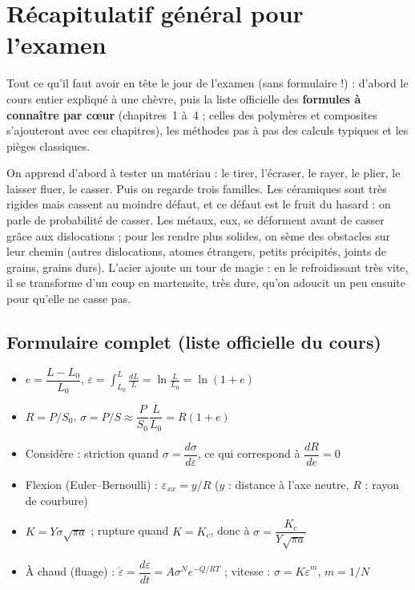 \chapter{Récapitulatif général pour l'examen}

\begin{rembox}[title=Ce chapitre]
Tout ce qu'il faut avoir en tête le jour de l'examen (sans formulaire !) : d'abord le cours
entier expliqué à une chèvre, puis la liste officielle des \textbf{formules à connaître par
c\oe ur} (chapitres~1 à~4 ; celles des polymères et composites s'ajouteront avec ces
chapitres), les méthodes pas à pas des calculs typiques et les pièges classiques.
\end{rembox}

\begin{goatbox}[title={Tout le cours à une chèvre}]
On apprend d'abord à \og tester\fg{} un matériau : le tirer, l'écraser, le rayer, le plier, le
laisser fluer, le casser. Puis on regarde trois familles. Les céramiques sont très rigides mais
cassent au moindre défaut, et ce défaut est le fruit du hasard : on parle de probabilité de
casser. Les métaux, eux, se déforment avant de casser grâce aux dislocations ; pour les rendre
plus solides, on sème des obstacles sur leur chemin (autres dislocations, atomes étrangers,
petits précipités, joints de grains, grains durs). L'acier ajoute un tour de magie : en le
refroidissant très vite, il se transforme d'un coup en martensite, très dure, qu'on adoucit un
peu ensuite pour qu'elle ne casse pas.
\end{goatbox}

\section{Formulaire complet (liste officielle du cours)}

\begin{keybox}[title=Chapitre 1 --- Les essais mécaniques]
\begin{itemize}
  \item $e = \dfrac{L - L_0}{L_0}$, \quad $\varepsilon = \displaystyle\int_{L_0}^{L}\frac{dL}{L} = \ln\frac{L}{L_0} = \ln(1+e)$
  \item $R = P/S_0$, \quad $\sigma = P/S \approx \dfrac{P}{S_0}\dfrac{L}{L_0} = R(1+e)$
  \item Considère : striction quand $\sigma = \dfrac{d\sigma}{d\varepsilon}$, ce qui correspond à $\dfrac{dR}{de} = 0$
  \item Flexion (Euler--Bernoulli) : $\varepsilon_{xx} = y/R$ ($y$ : distance à l'axe neutre, $R$ : rayon de courbure)
  \item $K = Y\sigma\sqrt{\pi a}$ ; rupture quand $K = K_c$, donc à $\sigma = \dfrac{K_c}{Y\sqrt{\pi a}}$
  \item À chaud (fluage) : $\dot\varepsilon = \dfrac{d\varepsilon}{dt} = A\sigma^N e^{-Q/RT}$ ;
        vitesse : $\sigma = K\dot\varepsilon^m$, $m = 1/N$
\end{itemize}
\end{keybox}

